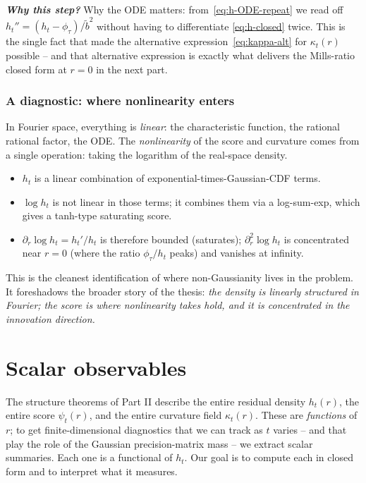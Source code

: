 \documentclass[11pt,a4paper,openany]{book}
\theoremstyle{plainserif}
\theoremstyle{definition}
\theoremstyle{remarkstyle}
\newenvironment{whybox}{%
  \begin{center}\begin{minipage}{0.95\linewidth}\small
  \textbf{\textit{Why this step?}}\quad\ignorespaces}{%
  \end{minipage}\end{center}}
\newcommand{\btilde}{\tilde{b}}
\begin{document}
\begin{whybox}
Why the ODE matters: from~\eqref{eq:h-ODE-repeat} we read off
$h_t'' = (h_t - \phi_\tau)/\btilde^2$ without having to differentiate
\eqref{eq:h-closed} twice. This is the single fact that made the
alternative expression~\eqref{eq:kappa-alt} for $\kappa_t(r)$ possible --
and that alternative expression is exactly what delivers the Mills-ratio
closed form at $r=0$ in the next part.
\end{whybox}

\section{A diagnostic: where nonlinearity enters}
\label{sec:nonlinearity-diagnosis}

In Fourier space, everything is \emph{linear}: the characteristic
function, the rational rational factor, the ODE. The \emph{nonlinearity}
of the score and curvature comes from a single operation: taking the
logarithm of the real-space density.
\begin{itemize}[leftmargin=2em, topsep=3pt]
\item $h_t$ is a linear combination of exponential-times-Gaussian-CDF
terms.
\item $\log h_t$ is not linear in those terms; it combines them via a
log-sum-exp, which gives a tanh-type saturating score.
\item $\partial_r \log h_t = h_t'/h_t$ is therefore bounded (saturates);
$\partial_r^2 \log h_t$ is concentrated near $r=0$ (where the ratio
$\phi_\tau/h_t$ peaks) and vanishes at infinity.
\end{itemize}
This is the cleanest identification of where non-Gaussianity lives in the
problem. It foreshadows the broader story of the thesis: \emph{the density
is linearly structured in Fourier; the score is where nonlinearity
takes hold, and it is concentrated in the innovation direction.}


\part{Scalar observables}

The structure theorems of Part II describe the entire residual density
$h_t(r)$, the entire score $\psi_t(r)$, and the entire curvature field
$\kappa_t(r)$. These are \emph{functions} of $r$; to get finite-dimensional
diagnostics that we can track as $t$ varies -- and that play the role of
the Gaussian precision-matrix mass -- we extract scalar summaries. Each
one is a functional of $h_t$. Our goal is to compute each in closed form
and to interpret what it measures.
\end{document}
